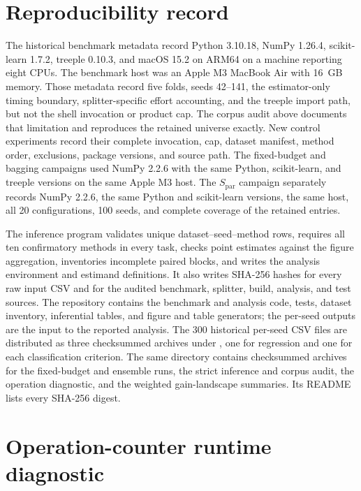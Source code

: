 \documentclass[final,5p,times,twocolumn]{elsarticle}
\begin{document}
\section{Reproducibility record}
\label{sec:supp_reproducibility}

The historical benchmark metadata record Python 3.10.18, NumPy 1.26.4,
scikit-learn 1.7.2, treeple 0.10.3, and macOS 15.2 on ARM64 on a machine
reporting eight CPUs.  The benchmark host was an Apple M3 MacBook Air with
16~GB memory.  Those metadata record five folds, seeds 42--141, the
estimator-only timing boundary, splitter-specific effort accounting, and the
treeple import path, but not the shell invocation or product cap.  The corpus
audit above documents that limitation and reproduces the retained universe
exactly.  New control experiments record their complete invocation, cap,
dataset manifest, method order, exclusions, package versions, and source path.
The fixed-budget and bagging campaigns used NumPy 2.2.6 with the same Python,
scikit-learn, and treeple versions on the same Apple M3 host.
The \(S_{\mathrm{par}}\) campaign separately records NumPy 2.2.6,
the same Python and scikit-learn versions, the same host, all 20 configurations,
100 seeds, and complete coverage of the retained entries.

\newpage

The inference program validates unique dataset--seed--method rows, requires all
ten confirmatory methods in every task, checks point estimates against the
figure aggregation, inventories incomplete paired blocks, and writes the
analysis environment and estimand definitions.  It also writes SHA-256 hashes
for every raw input CSV and for the audited benchmark, splitter, build,
analysis, and test sources.  The repository contains the benchmark and
analysis code, tests, dataset inventory, inferential tables, and figure and
table generators; the per-seed outputs are the input to the reported analysis.
The 300 historical per-seed CSV files are distributed as three checksummed
archives under , one for regression
and one for each classification criterion.  The same directory contains
checksummed archives for the fixed-budget and ensemble runs, the strict
inference and corpus audit, the operation diagnostic, and the weighted
gain-landscape summaries.  Its README lists every SHA-256 digest.

\section{Operation-counter runtime diagnostic}
\label{sec:supp_runtime_diagnostic}
\end{document}
